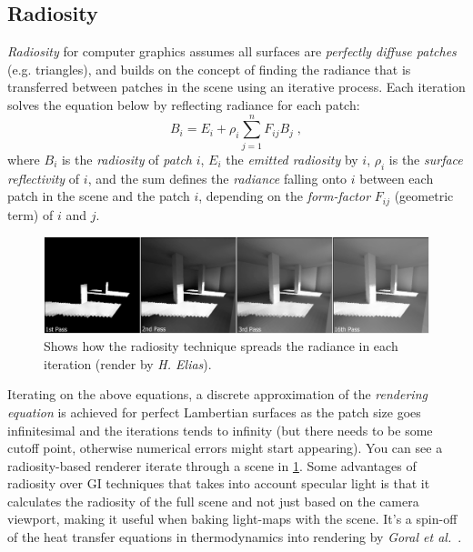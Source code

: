 \documentclass[a4paper, twocolumn]{article}
\begin{document}
    \subsection{Radiosity} \label{sec:radiosity}
    \textit{Radiosity} for computer graphics assumes all surfaces are \emph{perfectly diffuse patches} (e.g. triangles), and builds on the concept of finding the radiance that is transferred between patches in the scene using an iterative process. Each iteration solves the equation below by reflecting radiance for each patch: \begin{equation*}
        B_i = E_i + \rho_i \sum_{j=1}^{n} F_{ij} B_j \; ,
    \end{equation*}
    where \(B_i\) is the \textit{radiosity} of \emph{patch} \(i\), \(E_i\) the \emph{emitted radiosity} by \(i\), \(\rho_i\) is the \textit{surface reflectivity} of \(i\), and the sum defines the \emph{radiance} falling onto \(i\) between each patch in the scene and the patch \(i\), depending on the \emph{form-factor} \(F_{ij}\) (geometric term) of \(i\) and \(j\).

    \begin{figure}[ht]
        \centering
        \includegraphics[width=\linewidth]{share/radiosity.png}
        \caption{Shows how the radiosity technique spreads the radiance in each iteration (render by \emph{H. Elias}).}
        \label{fig:radiosity}
    \end{figure}

    \vspace{-0.5em}

Iterating on the above equations, a discrete approximation of the \textit{rendering equation} is achieved for perfect Lambertian surfaces as the patch size goes infinitesimal and the iterations tends to infinity (but there needs to be some cutoff point, otherwise numerical errors might start appearing). You can see a radiosity-based renderer iterate through a scene in \cref{fig:radiosity}. Some advantages of radiosity over GI techniques that takes into account specular light is that it calculates the radiosity of the full scene and not just based on the camera viewport, making it useful when baking light-maps with the scene. It's a spin-off of the heat transfer equations in thermodynamics into rendering by \emph{Goral et al.}~\cite{goral1984modeling}.
\end{document}
